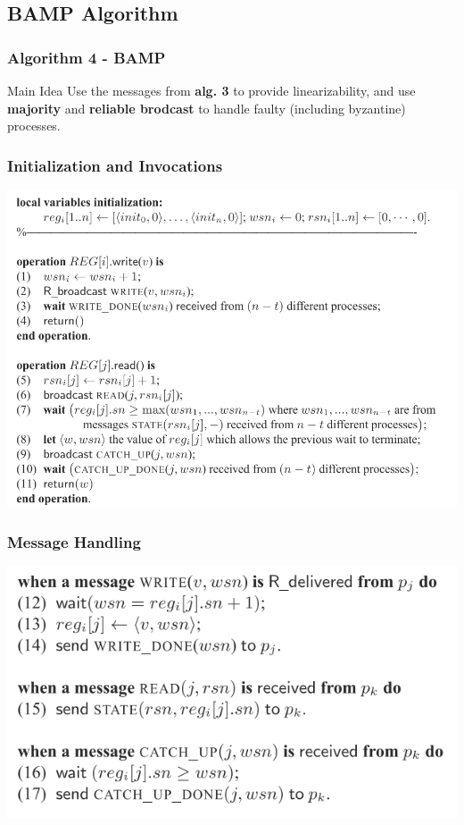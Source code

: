\subsection{BAMP Algorithm}

\begin{frame}
    \frametitle{Algorithm 4 - BAMP}
    \begin{block}{Main Idea}
        Use the messages from \textbf{alg. 3} to provide linearizability,
        and use \textbf{majority} and \textbf{reliable brodcast}
        to handle faulty (including byzantine) processes.
    \end{block}
\end{frame}

\begin{frame}
    \frametitle{Initialization and Invocations}
    \begin{center}
        \includegraphics[scale=.7]{resources/alg4_src1.png}
    \end{center}
\end{frame}
\begin{frame}
    \frametitle{Message Handling}
    \begin{center}
        \includegraphics[scale=.7]{resources/alg4_src2.png}
    \end{center}
\end{frame}